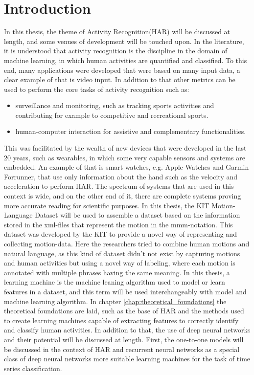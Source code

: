\chapter{Introduction}
	In this thesis, the theme of Activity Recognition(HAR) will be discussed at length, and some venues of development will be touched upon. In the literature, it is understood that activity recognition is the discipline in the domain of machine learning, in which human activities are quantified and classified\cite{adeli2014multi}. To this end, many applications were developed that were based on many input data, a clear example of that is video input\cite{adeli2014multi}. In addition to that other metrics can be used to perform the core tasks of activity recognition such as:
	\begin{itemize}
		\item surveillance and monitoring, such as tracking sports activities and contributing for example to competitive and recreational sports.
		\item human-computer interaction for assistive and complementary functionalities\cite{adeli2014multi}.
	\end{itemize}
	This was facilitated by the wealth of new devices that were developed in the last 20 years, such as wearables, in which some very capable sensors and systems are embedded. An example of that is smart watches, e.g. Apple Watches and Garmin Forrunner, that use only information about the hand such as the velocity and acceleration to perform HAR. The spectrum of systems that are used in this context is wide, and on the other end of it, there are complete systems proving more accurate reading for scientific purposes\cite{6365160}. In this thesis, the KIT Motion-Language Dataset will be used to assemble a dataset based on the information stored in the xml-files that represent the motion in the mmm-notation. This dataset was developed by the KIT to provide a novel way of representing and collecting motion-data. Here the researchers tried to combine human motions and natural language, as this kind of dataset didn't not exist\cite{Plappert2016} by capturing motions and human activities but using a novel way of labeling, where each motion is annotated with multiple phrases having the same meaning.\newline
	In this thesis, a learning machine is the machine leaning algorithm used to model or learn features in a dataset, and this term will be used interchangeably with model and machine learning algorithm. In chapter \ref{chap:theoretical_foundations} the theoretical foundations are laid, such as the base of HAR and the methods used to create learning machines capable of extracting features to correctly identify and classify human activities. In addition to that, the use of deep neural networks and their potential will be discussed at length. First, the one-to-one models will be discussed in the context of HAR and recurrent neural networks as a special class of deep neural networks more suitable learning machines for the task of time series classification.\newline
